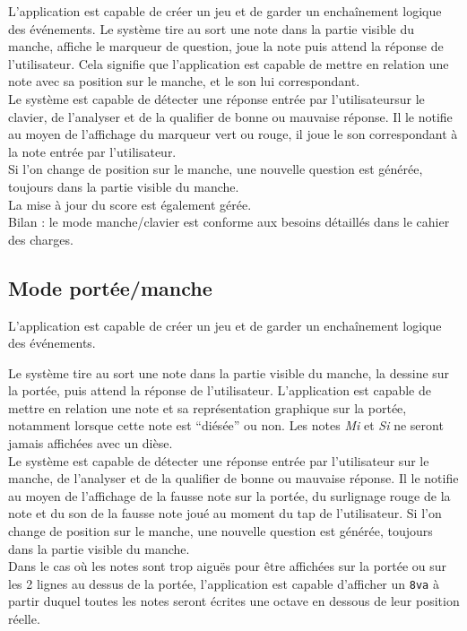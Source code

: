 \documentclass{scrreprt}
\begin{document}
L'application est capable de créer un jeu et de garder un enchaînement logique des événements.
Le système tire au sort une note dans la partie visible du manche, affiche le marqueur de question, joue la note puis attend la réponse de l'utilisateur. Cela signifie que l'application est capable de mettre en relation une note avec sa position sur le manche, et le son lui correspondant.\\
Le système est capable de détecter une réponse entrée par l'utilisateursur le clavier, de l'analyser et de la qualifier de bonne ou mauvaise réponse. Il le notifie au moyen de l'affichage du marqueur vert ou rouge, il joue le son correspondant à la note entrée par l'utilisateur. \\
Si l'on change de position sur le manche, une nouvelle question est générée, toujours dans la partie visible du manche.\\
La mise à jour du score est également gérée.\\
\medbreak
Bilan : le mode manche/clavier est conforme aux besoins détaillés dans le cahier des charges.


\subsection{Mode portée/manche}


L'application est capable de créer un jeu et de garder un enchaînement logique des événements.

Le système tire au sort une note dans la partie visible du manche, la dessine sur la portée, puis attend la réponse de l'utilisateur. 
L'application est capable de mettre en relation une note et sa représentation graphique sur la portée, notamment lorsque cette note est \enquote{diésée} ou non. Les notes \textit{Mi} et \textit{Si} ne seront jamais affichées avec un dièse.\\
Le système est capable de détecter une réponse entrée par l'utilisateur sur le manche, de l'analyser et de la qualifier de bonne ou mauvaise réponse. Il le notifie au moyen de l'affichage de la fausse note sur la portée, du surlignage rouge de la note et du son de la fausse note joué au moment du tap de l'utilisateur. Si l'on change de position sur le manche, une nouvelle question est générée, toujours dans la partie visible du manche.\\
Dans le cas où les notes sont trop aiguës pour être affichées sur la portée ou sur les 2 lignes au dessus de la portée, l'application est capable d'afficher un \texttt{8va} à partir duquel toutes les notes seront écrites une octave en dessous de leur position réelle.\\
\end{document}
